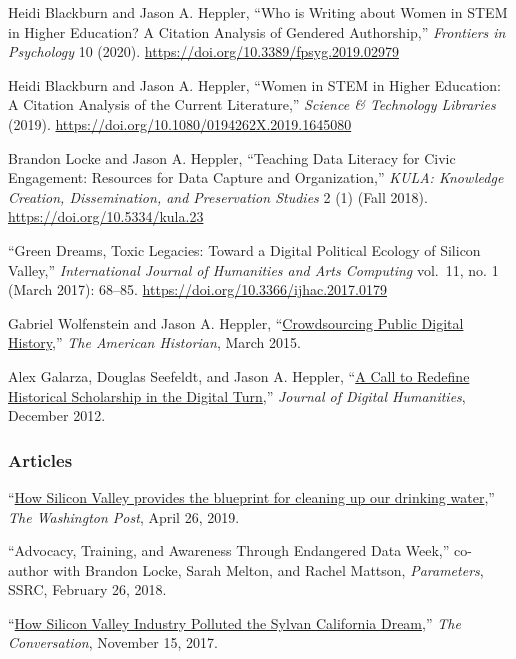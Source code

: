 Heidi Blackburn and Jason A. Heppler, ``Who is Writing about Women in
STEM in Higher Education? A Citation Analysis of Gendered Authorship,''
\emph{Frontiers in Psychology} 10 (2020).
\url{https://doi.org/10.3389/fpsyg.2019.02979}

Heidi Blackburn and Jason A. Heppler, ``Women in STEM in Higher
Education: A Citation Analysis of the Current Literature,''
\emph{Science \& Technology Libraries} (2019).
\url{https://doi.org/10.1080/0194262X.2019.1645080}

Brandon Locke and Jason A. Heppler, ``Teaching Data Literacy for Civic
Engagement: Resources for Data Capture and Organization,'' \emph{KULA:
Knowledge Creation, Dissemination, and Preservation Studies} 2 (1) (Fall
2018). \url{https://doi.org/10.5334/kula.23}

``Green Dreams, Toxic Legacies: Toward a Digital Political Ecology of
Silicon Valley,'' \emph{International Journal of Humanities and Arts
Computing} vol.~11, no. 1 (March 2017): 68--85.
\url{https://doi.org/10.3366/ijhac.2017.0179}

Gabriel Wolfenstein and Jason A. Heppler,
``\href{http://tah.oah.org/content/crowdsourcing-digital-public-history/}{Crowdsourcing
Public Digital History},'' \emph{The American Historian}, March 2015.

Alex Galarza, Douglas Seefeldt, and Jason A. Heppler,
``\href{http://journalofdigitalhumanities.org/1-4/a-call-to-redefine-historical-scholarship-in-the-digital-turn/}{A
Call to Redefine Historical Scholarship in the Digital Turn},''
\emph{Journal of Digital Humanities}, December 2012.

\subsubsection{Articles}\label{articles}

``\href{https://www.washingtonpost.com/outlook/2019/04/26/how-silicon-valley-provides-blueprint-cleaning-up-our-drinking-water/}{How
Silicon Valley provides the blueprint for cleaning up our drinking
water},'' \emph{The Washington Post}, April 26, 2019.

``Advocacy, Training, and Awareness Through Endangered Data Week,''
co-author with Brandon Locke, Sarah Melton, and Rachel Mattson,
\emph{Parameters}, SSRC, February 26, 2018.

``\href{https://theconversation.com/how-silicon-valley-industry-polluted-the-sylvan-california-dream-85810}{How
Silicon Valley Industry Polluted the Sylvan California Dream},''
\emph{The Conversation}, November 15, 2017.

